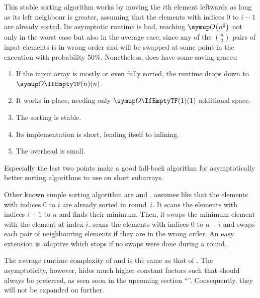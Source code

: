 \section{\texorpdfstring{\IS{}}{InsertionSort}}
\label{sec:tasklet:insertion}

This stable sorting algorithm works by moving the \(i\)th element leftwards as long as its left neighbour is greater, assuming that the elements with indices \(0\) to \(i - 1\) are already sorted.
Its asymptotic runtime is bad, reaching \(\bigoh*{n^2}\) not only in the worst case but also in the average case, since any of the \(\binom{n}{2}\) pairs of input elements is in wrong order and will be swapped at some point in the execution with probability 50\%.
Nonetheless, \IS{} does have some saving graces:
\begin{enumerate}
	\item
	If the input array is mostly or even fully sorted, the runtime drops down to \(\bigoh{n}\).

	\item
	It works in-place, needing only \(\bigoh{1}\) additional space.

	\item
	The sorting is stable.

	\item
	Its implementation is short, lending itself to inlining.

	\item
	The overhead is small.
\end{enumerate}
Especially the last two points make \IS{} a good fall-back algorithm for asymptotically better sorting algorithms to use on short subarrays.

\begin{note}
	Other known simple sorting algorithm are \SelS{} and \BS{}.
	\emph{\SelS{}} assumes like \IS{} that the elements with indices \(0\) to \(i\) are already sorted in round~\(i\).
	It scans the elements with indices \(i + 1\) to \(n\) and finds their minimum.
	Then, it swaps the minimum element with the element at index \(i\).
	\emph{\BS{}} scans the elements with indices \(0\) to \(n - i\) and swaps each pair of neighbouring elements if they are in the wrong order.
	An easy extension is adaptive \BS{} which stops if no swaps were done during a round.

	The average runtime complexity of \SelS{} and \BS{} is the same as that of \IS{}.
	The asymptoticity, however, hides much higher constant factors such that \IS{} should always be preferred, as seen soon in the upcoming section \enquote{}.
	Consequently, they will not be expanded on further.
\end{note}

